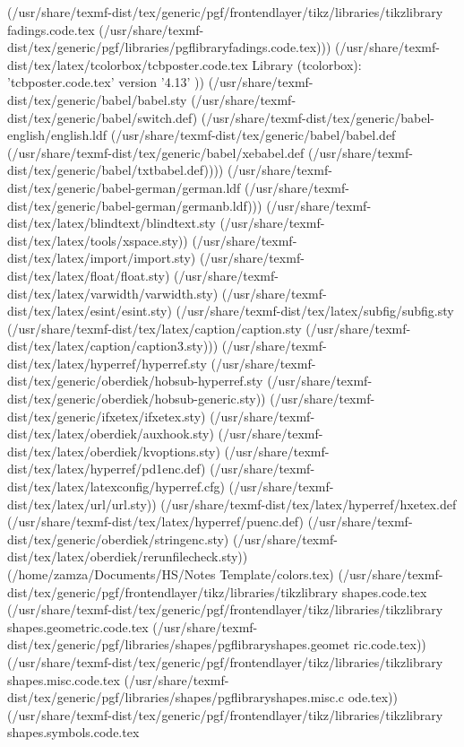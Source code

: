 (/usr/share/texmf-dist/tex/generic/pgf/frontendlayer/tikz/libraries/tikzlibrary
fadings.code.tex
(/usr/share/texmf-dist/tex/generic/pgf/libraries/pgflibraryfadings.code.tex)))
(/usr/share/texmf-dist/tex/latex/tcolorbox/tcbposter.code.tex
Library (tcolorbox): 'tcbposter.code.tex' version '4.13'
)) (/usr/share/texmf-dist/tex/generic/babel/babel.sty
(/usr/share/texmf-dist/tex/generic/babel/switch.def)
(/usr/share/texmf-dist/tex/generic/babel-english/english.ldf
(/usr/share/texmf-dist/tex/generic/babel/babel.def
(/usr/share/texmf-dist/tex/generic/babel/xebabel.def
(/usr/share/texmf-dist/tex/generic/babel/txtbabel.def))))
(/usr/share/texmf-dist/tex/generic/babel-german/german.ldf
(/usr/share/texmf-dist/tex/generic/babel-german/germanb.ldf)))
(/usr/share/texmf-dist/tex/latex/blindtext/blindtext.sty
(/usr/share/texmf-dist/tex/latex/tools/xspace.sty))
(/usr/share/texmf-dist/tex/latex/import/import.sty)
(/usr/share/texmf-dist/tex/latex/float/float.sty)
(/usr/share/texmf-dist/tex/latex/varwidth/varwidth.sty)
(/usr/share/texmf-dist/tex/latex/esint/esint.sty)
(/usr/share/texmf-dist/tex/latex/subfig/subfig.sty
(/usr/share/texmf-dist/tex/latex/caption/caption.sty
(/usr/share/texmf-dist/tex/latex/caption/caption3.sty)))
(/usr/share/texmf-dist/tex/latex/hyperref/hyperref.sty
(/usr/share/texmf-dist/tex/generic/oberdiek/hobsub-hyperref.sty
(/usr/share/texmf-dist/tex/generic/oberdiek/hobsub-generic.sty))
(/usr/share/texmf-dist/tex/generic/ifxetex/ifxetex.sty)
(/usr/share/texmf-dist/tex/latex/oberdiek/auxhook.sty)
(/usr/share/texmf-dist/tex/latex/oberdiek/kvoptions.sty)
(/usr/share/texmf-dist/tex/latex/hyperref/pd1enc.def)
(/usr/share/texmf-dist/tex/latex/latexconfig/hyperref.cfg)
(/usr/share/texmf-dist/tex/latex/url/url.sty))
(/usr/share/texmf-dist/tex/latex/hyperref/hxetex.def
(/usr/share/texmf-dist/tex/latex/hyperref/puenc.def)
(/usr/share/texmf-dist/tex/generic/oberdiek/stringenc.sty)
(/usr/share/texmf-dist/tex/latex/oberdiek/rerunfilecheck.sty))
(/home/zamza/Documents/HS/Notes Template/colors.tex)
(/usr/share/texmf-dist/tex/generic/pgf/frontendlayer/tikz/libraries/tikzlibrary
shapes.code.tex
(/usr/share/texmf-dist/tex/generic/pgf/frontendlayer/tikz/libraries/tikzlibrary
shapes.geometric.code.tex
(/usr/share/texmf-dist/tex/generic/pgf/libraries/shapes/pgflibraryshapes.geomet
ric.code.tex))
(/usr/share/texmf-dist/tex/generic/pgf/frontendlayer/tikz/libraries/tikzlibrary
shapes.misc.code.tex
(/usr/share/texmf-dist/tex/generic/pgf/libraries/shapes/pgflibraryshapes.misc.c
ode.tex))
(/usr/share/texmf-dist/tex/generic/pgf/frontendlayer/tikz/libraries/tikzlibrary
shapes.symbols.code.tex
